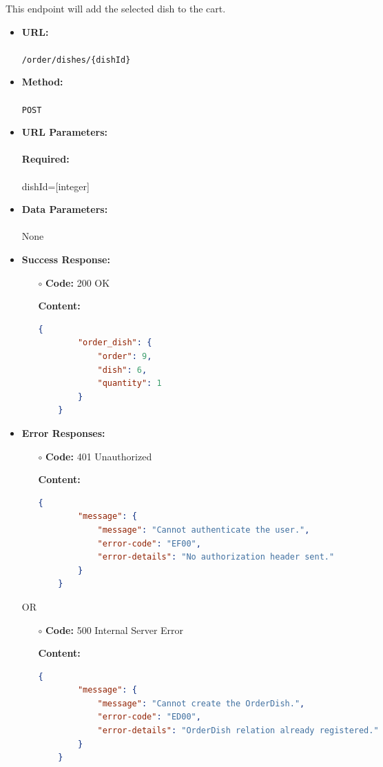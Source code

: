 

This endpoint will add the selected dish to the cart.

\begin{itemize}
    \item \textbf{URL:} \\\\\texttt{/order/dishes/\{dishId\}}
    \item \textbf{Method:} \\\\\texttt{POST}
    \item \textbf{URL Parameters:} \\\\
	\textbf{Required:}\\\\
	dishId=[integer]
    \item \textbf{Data Parameters:} \\\\None
    \item \textbf{Success Response:}
		\begin{itemize}
			\item[$\circ$] \textbf{Code:} 200 OK
			\item[] \textbf{Content:}
			\medskip
			\begin{lstlisting}[language=json]
	{
		"order_dish": {
			"order": 9,
			"dish": 6,
			"quantity": 1
		}
	}
			\end{lstlisting}
		\end{itemize}
	   \item \textbf{Error Responses:}
    	\begin{itemize}
			\item[$\circ$] \textbf{Code:} 401 Unauthorized
			\item[] \textbf{Content:}
			\begin{lstlisting}[language=json]
	{
		"message": {
			"message": "Cannot authenticate the user.",
			"error-code": "EF00",
			"error-details": "No authorization header sent."
		}
	}
			\end{lstlisting}
		\end{itemize}
	OR
    	\begin{itemize}
			\item[$\circ$] \textbf{Code:} 500 Internal Server Error
			\item[] \textbf{Content:}
			\begin{lstlisting}[language=json]
	{
		"message": {
			"message": "Cannot create the OrderDish.",
			"error-code": "ED00",
			"error-details": "OrderDish relation already registered."
		}
	}		
			\end{lstlisting}
		\end{itemize}
    					

\end{itemize}

